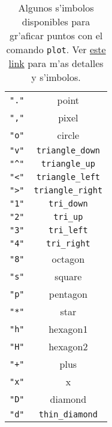 \documentclass[11pt]{exam}
\begin{document}
\begin{questions}
\begin{table}
\begin{center}
\begin{tabular}{cc}
\verb|"."|	& point \\
\verb|","| & pixel \\
\verb|"o"|	& circle \\
\verb|"v"|	& \verb|triangle_down| \\
\verb|"^"|	& \verb|triangle_up| \\
\verb|"<"|	& \verb|triangle_left| \\
\verb|">"|	& \verb|triangle_right| \\
\verb|"1"|	& \verb|tri_down| \\
\verb|"2"|	& \verb|tri_up| \\
\verb|"3"|	& \verb|tri_left| \\
\verb|"4"|	& \verb|tri_right| \\
\verb|"8"|	& octagon \\
\verb|"s"|	& square \\
\verb|"p"|	& pentagon \\
\verb|"*"|	& star \\
\verb|"h"|	& hexagon1 \\
\verb|"H"|	& hexagon2 \\
\verb|"+"|	& plus \\
\verb|"x"|	& x \\
\verb|"D"|	& diamond \\
\verb|"d"|	& \verb|thin_diamond| 
\end{tabular}
\caption{Algunos s'imbolos disponibles para gr'aficar puntos con el comando \texttt{plot}. Ver \href{http://matplotlib.org/api/markers_api.html}{este link} para m'as detalles y s'imbolos.}
\label{t}
\end{center}
\end{table}

\end{questions}
\end{document}
